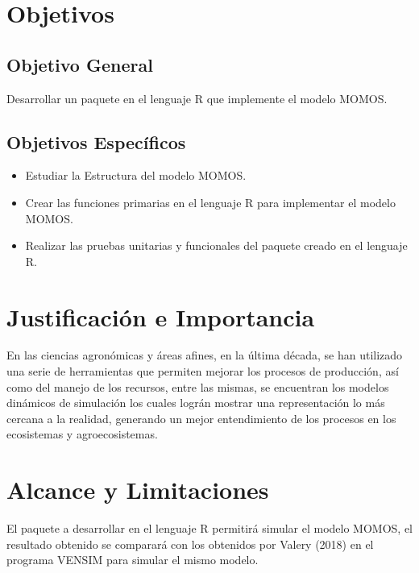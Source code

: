\section{Objetivos}

\subsection{Objetivo General}
Desarrollar un paquete en el lenguaje R que implemente el modelo MOMOS.


\subsection{Objetivos Espec\'ificos}

\begin{itemize}
\item Estudiar la Estructura del modelo MOMOS.\\
\item Crear las funciones primarias en el lenguaje R para implementar el modelo MOMOS.\\
\item Realizar las pruebas unitarias y funcionales del paquete creado en el lenguaje R.\\
\end{itemize}

\section{Justificaci\'on e Importancia}

En las ciencias agronómicas y áreas afines, en la última década, se han utilizado una serie de herramientas que permiten mejorar los procesos de producción, así como del manejo de los recursos, entre las mismas, se encuentran los modelos dinámicos de simulación los cuales lográn mostrar una representación lo más cercana a la realidad, generando un mejor entendimiento de los procesos en los ecosistemas y agroecosistemas. \\

\section{Alcance y Limitaciones}

El paquete a desarrollar en el lenguaje R permitirá simular el modelo MOMOS, el resultado obtenido se comparará con los obtenidos por Valery (2018) en el programa VENSIM para simular el mismo modelo. \\
